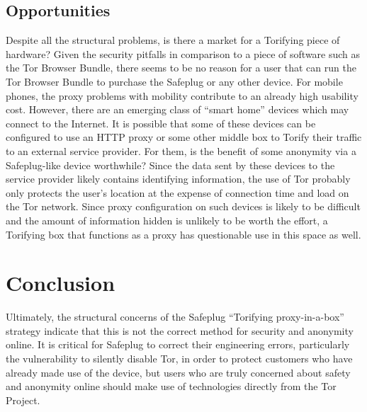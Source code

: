 \documentclass[conference]{IEEEtran}
\begin{document}
\subsection{Opportunities}
Despite all the structural problems, is there a market for a Torifying piece of hardware?  Given the security pitfalls in comparison to a piece of software such as the Tor Browser Bundle, there seems to be no reason for a user that can run the Tor Browser Bundle to purchase the Safeplug or any other device.  For mobile phones, the proxy problems with mobility contribute to an already high usability cost.  However, there are an emerging class of ``smart home'' devices which may connect to the Internet.  It is possible that some of these devices can be configured to use an HTTP proxy or some other middle box to Torify their traffic to an external service provider.  For them, is the benefit of some anonymity via a Safeplug-like device worthwhile?  Since the data sent by these devices to the service provider likely contains identifying information, the use of Tor probably only protects the user's location at the expense of connection time and load on the Tor network.  Since proxy configuration on such devices is likely to be difficult and the amount of information hidden is unlikely to be worth the effort, a Torifying box that functions as a proxy has questionable use in this space as well.

\section{Conclusion}
Ultimately, the structural concerns of the Safeplug ``Torifying proxy-in-a-box'' strategy indicate that this is not the correct method for security and anonymity online.  It is critical for Safeplug to correct their engineering errors, particularly the vulnerability to silently disable Tor, in order to protect customers who have already made use of the device, but users who are truly concerned about safety and anonymity online should make use of technologies directly from the Tor Project.


\end{document}
